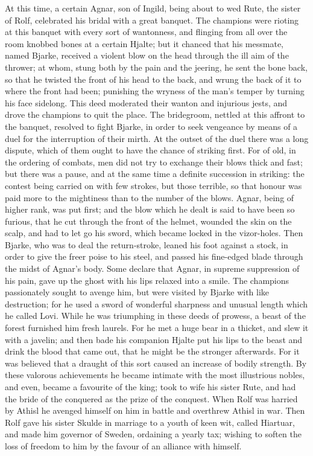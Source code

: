 \documentclass[10pt,a4paper]{report}
\begin{document}
At this time, a certain Agnar, son of Ingild, being about to wed Rute, the sister of Rolf, celebrated his bridal with a great banquet. The champions were rioting at this banquet with every sort of wantonness, and flinging from all over the room knobbed bones at a certain Hjalte; but it chanced that his messmate, named Bjarke, received a violent blow on the head through the ill aim of the thrower; at whom, stung both by the pain and the jeering, he sent the bone back, so that he twisted the front of his head to the back, and wrung the back of it to where the front had been; punishing the wryness of the man's temper by turning his face sidelong. This deed moderated their wanton and injurious jests, and drove the champions to quit the place. The bridegroom, nettled at this affront to the banquet, resolved to fight Bjarke, in order to seek vengeance by means of a duel for the interruption of their mirth. At the outset of the duel there was a long dispute, which of them ought to have the chance of striking first. For of old, in the ordering of combats, men did not try to exchange their blows thick and fast; but there was a pause, and at the same time a definite succession in striking: the contest being carried on with few strokes, but those terrible, so that honour was paid more to the mightiness than to the number of the blows. Agnar, being of higher rank, was put first; and the blow which he dealt is said to have been so furious, that he cut through the front of the helmet, wounded the skin on the scalp, and had to let go his sword, which became locked in the vizor-holes. Then Bjarke, who was to deal the return-stroke, leaned his foot against a stock, in order to give the freer poise to his steel, and passed his fine-edged blade through the midst of Agnar's body. Some declare that Agnar, in supreme suppression of his pain, gave up the ghost with his lips relaxed into a smile. The champions passionately sought to avenge him, but were visited by Bjarke with like destruction; for he used a sword of wonderful sharpness and unusual length which he called Lovi. While he was triumphing in these deeds of prowess, a beast of the forest furnished him fresh laurels. For he met a huge bear in a thicket, and slew it with a javelin; and then bade his companion Hjalte put his lips to the beast and drink the blood that came out, that he might be the stronger afterwards. For it was believed that a draught of this sort caused an increase of bodily strength. By these valorous achievements he became intimate with the most illustrious nobles, and even, became a favourite of the king; took to wife his sister Rute, and had the bride of the conquered as the prize of the conquest. When Rolf was harried by Athisl he avenged himself on him in battle and overthrew Athisl in war. Then Rolf gave his sister Skulde in marriage to a youth of keen wit, called Hiartuar, and made him governor of Sweden, ordaining a yearly tax; wishing to soften the loss of freedom to him by the favour of an alliance with himself.\\
\end{document}
